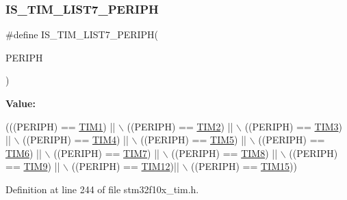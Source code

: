 \subsubsection{\texorpdfstring{I\+S\+\_\+\+T\+I\+M\+\_\+\+L\+I\+S\+T7\+\_\+\+P\+E\+R\+I\+PH}{IS\_TIM\_LIST7\_PERIPH}}
{\footnotesize\ttfamily \#define I\+S\+\_\+\+T\+I\+M\+\_\+\+L\+I\+S\+T7\+\_\+\+P\+E\+R\+I\+PH(\begin{DoxyParamCaption}\item[{}]{P\+E\+R\+I\+PH }\end{DoxyParamCaption})}

{\bfseries Value\+:}
\begin{DoxyCode}
(((PERIPH) == \hyperlink{group___peripheral__declaration_ga2e87451fea8dc9380056d3cfc5ed81fb}{TIM1}) || \(\backslash\)
                                      ((PERIPH) == \hyperlink{group___peripheral__declaration_ga3cfac9f2e43673f790f8668d48b4b92b}{TIM2}) || \(\backslash\)
                                      ((PERIPH) == \hyperlink{group___peripheral__declaration_ga61ee4c391385607d7af432b63905fcc9}{TIM3}) || \(\backslash\)
                                      ((PERIPH) == \hyperlink{group___peripheral__declaration_ga91a09bad8bdc7a1cb3d85cf49c94c8ec}{TIM4}) || \(\backslash\)
                                      ((PERIPH) == \hyperlink{group___peripheral__declaration_ga5125ff6a23a2ed66e2e19bd196128c14}{TIM5}) || \(\backslash\)
                                      ((PERIPH) == \hyperlink{group___peripheral__declaration_gac7b4ed55f9201b498b38c962cca97314}{TIM6}) || \(\backslash\)
                                      ((PERIPH) == \hyperlink{group___peripheral__declaration_ga49267c49946fd61db6af8b49bcf16394}{TIM7}) || \(\backslash\)
                                      ((PERIPH) == \hyperlink{group___peripheral__declaration_ga9a3660400b17735e91331f256095810e}{TIM8}) || \(\backslash\)
                                      ((PERIPH) == \hyperlink{group___peripheral__declaration_gaf52b4b4c36110a0addfa98059f54a50e}{TIM9}) || \(\backslash\)
                                      ((PERIPH) == \hyperlink{group___peripheral__declaration_ga2397f8a0f8e7aa10cf8e8c049e431e53}{TIM12})|| \(\backslash\)
                                      ((PERIPH) == \hyperlink{group___peripheral__declaration_ga87e4b442041d1c03a6af113fbe04a182}{TIM15}))
\end{DoxyCode}


Definition at line 244 of file stm32f10x\+\_\+tim.\+h.

\mbox{\label{group___t_i_m___exported__constants_ga120d98895bd48d628028753212b68233}} 

